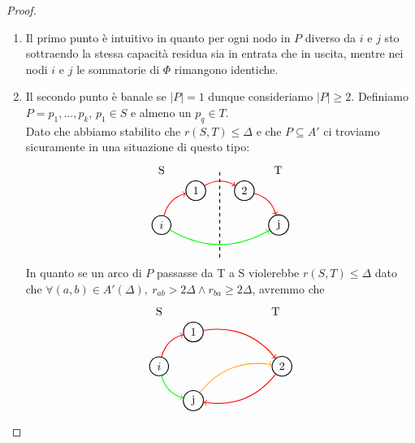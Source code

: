         \begin{proof} \begin{enumerate}
                \item Il primo punto è intuitivo in quanto per ogni nodo in $P$ diverso da $i$ e $j$ sto sottraendo la stessa capacità residua sia in entrata che in uscita, mentre nei nodi $i$ e $j$ le sommatorie di $\Phi$ rimangono identiche.
                \item Il secondo punto è banale se $|P|= 1$ dunque consideriamo $|P|\ge 2$. Definiamo $P = p_1, ..., p_k$, $p_1 \in S$ e almeno un $p_q\in T$.\\
                    Dato che abbiamo stabilito che $r(S,T) \le \Delta$ e che $P\subseteq A'$ ci troviamo sicuramente in una situazione di questo tipo:
                    \[\begin{tikzpicture}[node distance={15mm}, thick , main/.style = {draw, circle}] 
                        \node[main] (0) {$i$};
                        \node[main] (1) [above right of = 0] {1};
                        \node[main] (2) [right of = 1] {2};
                        \node[main] (3) [below right of = 2] {j};
                        \node at (0,1.7) {S};
                        \node at (3.6,1.7) {T};
    
                        \draw[->] (0) [red, bend left] to (1);
                        \draw[->] (1) [red, bend left] to (2);
                        \draw[->] (2) [red, bend left] to (3);
                        \draw[->] (0) [green, bend right] to (3);
    
                        \draw[dashed] (1.8,-1) -- (1.8,1.7);
                    \end{tikzpicture}\]
                    In quanto se un arco di $P$ passasse da T a S violerebbe $r(S,T)\le \Delta$ dato che $\forall (a,b)\in A'(\Delta),\ r_{ab} > 2\Delta \land r_{ba}\ge 2\Delta$, avremmo che
                    \[\begin{tikzpicture}[node distance={15mm}, thick , main/.style = {draw, circle}] 
                        \node[main] (0) {$i$};
                        \node[main] (1) [above right of = 0] {1};
                        \node[main] (2) at (3.8,0) {2};
                        \node[main] (3) [below right of = 0] {j};
                        \node at (0,1.7) {S};
                        \node at (3.6,1.7) {T};
    
                        \draw[->] (0) [red,bend left] to (1);
                        \draw[->] (1) [red,bend left] to (2);
                        \draw[->] (2) [red,bend left] to (3);
                        \draw[->] (3) [thick = 1.5, darktangerine, bend left] to (2);
                        \draw[->] (0) [green, bend right] to (3);
    

\end{tikzpicture}\]
\end{enumerate}
\end{proof}

